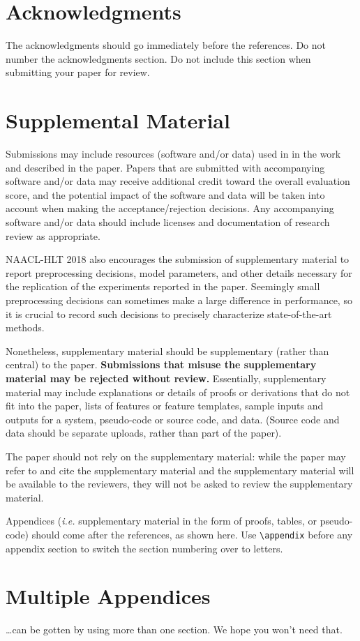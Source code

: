 \documentclass[11pt,a4paper]{article}
\begin{document}
\section*{Acknowledgments}

The acknowledgments should go immediately before the references.  Do
not number the acknowledgments section. Do not include this section
when submitting your paper for review.

%
%



\appendix

\section{Supplemental Material}
\label{sec:supplemental}
Submissions may include resources (software and/or data) used in in the work and described in the paper. Papers that are submitted with accompanying software and/or data may receive additional credit toward the overall evaluation score, and the potential impact of the software and data will be taken into account when making the acceptance/rejection decisions. Any accompanying software and/or data should include licenses and documentation of research review as appropriate.


NAACL-HLT 2018 also encourages the submission of supplementary material to report preprocessing decisions, model parameters, and other details necessary for the replication of the experiments reported in the paper. Seemingly small preprocessing decisions can sometimes make a large difference in performance, so it is crucial to record such decisions to precisely characterize state-of-the-art methods. 

Nonetheless, supplementary material should be supplementary (rather
than central) to the paper. {\bf Submissions that misuse the supplementary 
material may be rejected without review.}
Essentially, supplementary material may include explanations or details
of proofs or derivations that do not fit into the paper, lists of
features or feature templates, sample inputs and outputs for a system,
pseudo-code or source code, and data. (Source code and data should
be separate uploads, rather than part of the paper).

The paper should not rely on the supplementary material: while the paper
may refer to and cite the supplementary material and the supplementary material will be available to the
reviewers, they will not be asked to review the
supplementary material.


Appendices ({\em i.e.} supplementary material in the form of proofs, tables,
or pseudo-code) should come after the references, as shown here. Use
\verb|\appendix| before any appendix section to switch the section
numbering over to letters.

\section{Multiple Appendices}
\dots can be gotten by using more than one section. We hope you won't
need that.
\end{document}
